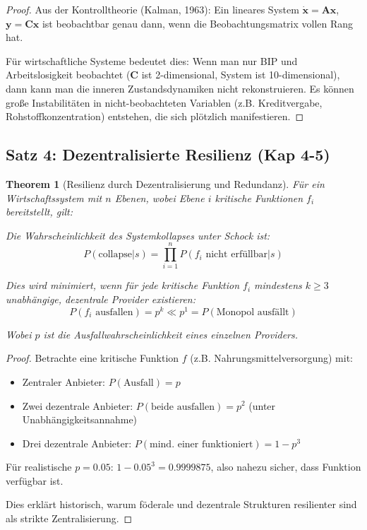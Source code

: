 \documentclass[a4paper, 12pt, twoside, openright]{report}
\newtheorem{theorem}{Theorem}[section]
\theoremstyle{definition}
\theoremstyle{definition}
\begin{document}
\begin{proof}
Aus der Kontrolltheorie (Kalman, 1963): Ein lineares System $\dot{\mathbf{x}} = \mathbf{A}\mathbf{x}$, $\mathbf{y} = \mathbf{C}\mathbf{x}$ ist beobachtbar genau dann, wenn die Beobachtungsmatrix vollen Rang hat. 

Für wirtschaftliche Systeme bedeutet dies: Wenn man nur BIP und Arbeitslosigkeit beobachtet ($\mathbf{C}$ ist 2-dimensional, System ist 10-dimensional), dann kann man die inneren Zustandsdynamiken nicht rekonstruieren. Es können große Instabilitäten in nicht-beobachteten Variablen (z.B. Kreditvergabe, Rohstoffkonzentration) entstehen, die sich plötzlich manifestieren.
\end{proof}

\subsection{Satz 4: Dezentralisierte Resilienz (Kap 4-5)}

\begin{theorem}[Resilienz durch Dezentralisierung und Redundanz]
\label{thm:dezentralisierte-resilienz}
Für ein Wirtschaftssystem mit $n$ Ebenen, wobei Ebene $i$ kritische Funktionen $f_i$ bereitstellt, gilt:

Die Wahrscheinlichkeit des Systemkollapses unter Schock ist:
\begin{equation}
P(\text{collapse}|s) = \prod_{i=1}^{n} P(f_i \text{ nicht erfüllbar}|s)
\end{equation}

Dies wird minimiert, wenn für jede kritische Funktion $f_i$ mindestens $k \geq 3$ unabhängige, dezentrale Provider existieren:
\begin{equation}
P(f_i \text{ ausfallen}) = p^k \ll p^1 = P(\text{Monopol ausfällt})
\end{equation}

Wobei $p$ ist die Ausfallwahrscheinlichkeit eines einzelnen Providers.
\end{theorem}

\begin{proof}
Betrachte eine kritische Funktion $f$ (z.B. Nahrungsmittelversorgung) mit:
\begin{itemize}
\item Zentraler Anbieter: $P(\text{Ausfall}) = p$
\item Zwei dezentrale Anbieter: $P(\text{beide ausfallen}) = p^2$ (unter Unabhängigkeitsannahme)
\item Drei dezentrale Anbieter: $P(\text{mind. einer funktioniert}) = 1 - p^3$
\end{itemize}

Für realistische $p = 0.05$: $1 - 0.05^3 = 0.9999875$, also nahezu sicher, dass Funktion verfügbar ist.

Dies erklärt historisch, warum föderale und dezentrale Strukturen resilienter sind als strikte Zentralisierung.
\end{proof}
\end{document}
